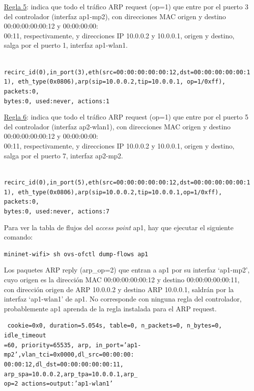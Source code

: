 \documentclass[a4paper,12pt,twoside,spanish]{book}
\begin{document}
\underline{Regla 5}: indica que todo el tráfico ARP request (op=1) que entre por el puerto 3 del controlador (interfaz ap1-mp2), con direcciones MAC origen y destino 00:00:00:00:00:12 y 00:00:00:00:\\
00:11, respectivamente, y direcciones IP 10.0.0.2 y 10.0.0.1, origen y destino, salga por el puerto 1, interfaz ap1-wlan1.\par

\noindent\texttt{
	recirc\_id(0),in\_port(3),eth(src=00:00:00:00:00:12,dst=00:00:00:00:00:11),
	eth\_type(0x0806),arp(sip=10.0.0.2,tip=10.0.0.1,
	op=1/0xff), packets:0,\\
	bytes:0, used:never, actions:1
}

\underline{Regla 6}: indica que todo el tráfico ARP request (op=1) que entre por el puerto 5 del controlador (interfaz ap2-wlan1), con direcciones MAC origen y destino 00:00:00:00:00:12 y 00:00:00:00:\\
00:11, respectivamente, y direcciones IP 10.0.0.2 y 10.0.0.1, origen y destino, salga por el puerto 7, interfaz ap2-mp2.\par 

\noindent\texttt{
	recirc\_id(0),in\_port(5),eth(src=00:00:00:00:00:12,dst=00:00:00:00:00:11),
	eth\_type(0x0806),arp(sip=10.0.0.2,tip=10.0.0.1,op=1/0xff), packets:0, \\
	bytes:0, used:never, actions:7
}

\hspace{1cm}

Para ver la tabla de flujos del \textit{access point} ap1, hay que ejecutar el siguiente comando:\par 

\begin{center}
	\texttt{mininet-wifi> sh ovs-ofctl dump-flows ap1}
\end{center}

Los paquetes ARP reply (arp\_op=2) que entran a ap1 por su interfaz ‘ap1-mp2’, cuyo origen es la dirección MAC 00:00:00:00:00:12 y destino 00:00:00:00:00:11, con dirección origen de ARP 10.0.0.2 y destino ARP 10.0.0.1, saldrán por la interfaz ‘ap1-wlan1’ de ap1. No corresponde con ninguna regla del controlador, probablemente ap1 aprenda de la regla instalada para el ARP request.\par 

\noindent\texttt{
	cookie=0x0, duration=5.054s, table=0, n\_packets=0, n\_bytes=0, idle\_timeout\\
	=60, priority=65535, arp,
	in\_port='ap1-mp2',vlan\_tci=0x0000,dl\_src=00:00:00:\\
	00:00:12,dl\_dst=00:00:00:00:00:11,
	arp\_spa=10.0.0.2,arp\_tpa=10.0.0.1,arp\_\\
	op=2 actions=output:'ap1-wlan1'
}
\end{document}
